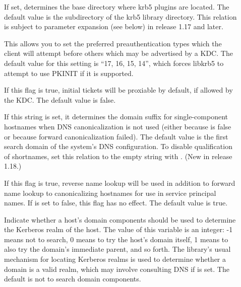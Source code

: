 \documentclass[letterpaper,10pt,english]{sphinxmanual}
\begin{document}
\begin{description}
\item[{}] \leavevmode
If set, determines the base directory where krb5 plugins are
located.  The default value is the  subdirectory
of the krb5 library directory.  This relation is subject to
parameter expansion (see below) in release 1.17 and later.

\item[{}] \leavevmode
This allows you to set the preferred preauthentication types which
the client will attempt before others which may be advertised by a
KDC.  The default value for this setting is “17, 16, 15, 14”,
which forces libkrb5 to attempt to use PKINIT if it is supported.

\item[{}] \leavevmode
If this flag is true, initial tickets will be proxiable by
default, if allowed by the KDC.  The default value is false.

\item[{}] \leavevmode
If this string is set, it determines the domain suffix for
single-component hostnames when DNS canonicalization is not used
(either because  is false or because
forward canonicalization failed).  The default value is the first
search domain of the system’s DNS configuration.  To disable
qualification of shortnames, set this relation to the empty string
with .  (New in release 1.18.)

\item[{}] \leavevmode
If this flag is true, reverse name lookup will be used in addition
to forward name lookup to canonicalizing hostnames for use in
service principal names.  If  is set
to false, this flag has no effect.  The default value is true.

\item[{}] \leavevmode
Indicate whether a host’s domain components should be used to
determine the Kerberos realm of the host.  The value of this
variable is an integer: -1 means not to search, 0 means to try the
host’s domain itself, 1 means to also try the domain’s immediate
parent, and so forth.  The library’s usual mechanism for locating
Kerberos realms is used to determine whether a domain is a valid
realm, which may involve consulting DNS if  is
set.  The default is not to search domain components.


\end{description}
\end{document}
